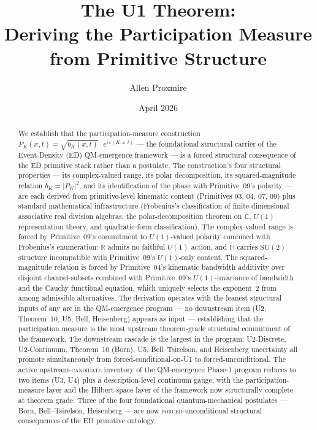 \documentclass[11pt,a4paper]{article}
\title{The U1 Theorem:\\ Deriving the Participation Measure from Primitive Structure}
\author{Allen Proxmire}
\date{April 2026}
\begin{document}
\maketitle

\begin{abstract}
We establish that the participation-measure construction $P_K(x, t) = \sqrt{b_K(x, t)} \cdot e^{i \pi(K, x, t)}$ --- the foundational structural carrier of the Event-Density (ED) QM-emergence framework --- is a forced structural consequence of the ED primitive stack rather than a postulate. The construction's four structural properties --- its complex-valued range, its polar decomposition, its squared-magnitude relation $b_K = |P_K|^2$, and its identification of the phase with Primitive~09's polarity --- are each derived from primitive-level kinematic content (Primitives 03, 04, 07, 09) plus standard mathematical infrastructure (Frobenius's classification of finite-dimensional associative real division algebras, the polar-decomposition theorem on $\mathbb{C}$, $U(1)$ representation theory, and quadratic-form classification). The complex-valued range is forced by Primitive~09's commitment to $U(1)$-valued polarity combined with Frobenius's enumeration: $\mathbb{R}$ admits no faithful $U(1)$ action, and $\mathbb{H}$ carries $\mathrm{SU}(2)$ structure incompatible with Primitive~09's $U(1)$-only content. The squared-magnitude relation is forced by Primitive~04's kinematic bandwidth additivity over disjoint channel-subsets combined with Primitive~09's $U(1)$-invariance of bandwidth and the Cauchy functional equation, which uniquely selects the exponent~2 from among admissible alternatives. The derivation operates with the leanest structural inputs of any arc in the QM-emergence program --- no downstream item (U2, Theorem~10, U5, Bell, Heisenberg) appears as input --- establishing that the participation measure is the most upstream theorem-grade structural commitment of the framework. The downstream cascade is the largest in the program: U2-Discrete, U2-Continuum, Theorem~10 (Born), U5, Bell--Tsirelson, and Heisenberg uncertainty all promote simultaneously from forced-conditional-on-U1 to forced-unconditional. The active upstream-\textsc{candidate} inventory of the QM-emergence Phase-1 program reduces to two items (U3, U4) plus a description-level continuum gauge, with the participation-measure layer and the Hilbert-space layer of the framework now structurally complete at theorem grade. Three of the four foundational quantum-mechanical postulates --- Born, Bell--Tsirelson, Heisenberg --- are now \textsc{forced}-unconditional structural consequences of the ED primitive ontology.
\end{abstract}
\end{document}
